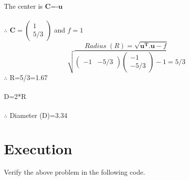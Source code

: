 \documentclass[10pt, a4paper]{article}
\newcommand{\myvec}[1]{\ensuremath{\begin{pmatrix}#1\end{pmatrix}}}
\let\vec\mathbf
\begin{document}
The center is $\vec{C}$=-$\vec{u}$\\\\
$\therefore$ $\vec{C} = \myvec{1\\ 5/3}$
 and $f = 1$ \\
\begin{equation}
	Radius\;(R) =\sqrt{\vec{u^T}.\vec{u}-f}
\end{equation}
\begin{equation}                                                                                   \sqrt{\myvec{-1 &-5/3}\myvec{-1\\-5/3}-1} =5/3                                        
\end{equation}
$\therefore$ R=5/3=1.67\\\\
D=2*R\\\\
$\therefore$ Diameter (D)=3.34
\section{Execution}
Verify the above problem in the following code.\\

\end{document}
